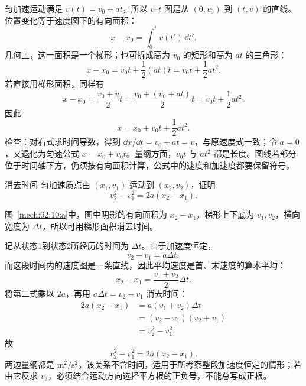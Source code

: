 {\begin{xesolution}
匀加速运动满足 $v(t)=v_0+at$，所以 $v$--$t$ 图是从 $(0,v_0)$ 到
$(t,v)$ 的直线。位置变化等于速度图下的有向面积：
\[
 x-x_0=\int_0^t v(t')\,\dd t'.
\]
几何上，这一面积是一个梯形；也可拆成高为 $v_0$ 的矩形和高为 $at$ 的三角形：
\[
 x-x_0=v_0t+\frac12(at)t
 =v_0t+\frac12at^2.
\]
若直接用梯形面积，同样有
\[
  x-x_0=\frac{v_0+v}{2}t
  =\frac{v_0+(v_0+at)}{2}t
  =v_0t+\frac12at^2.
\]
因此
\[
 \boxed{x=x_0+v_0t+\frac12at^2}.
\]
检查：对右式求时间导数，得到 $\dd x/\dd t=v_0+at=v$，与原速度式一致；令 $a=0$，又退化为匀速公式 $x=x_0+v_0t$。量纲方面，$v_0t$ 与 $at^2$ 都是长度。图线若部分位于时间轴下方，仍须按有向面积计算，公式中的速度和加速度都要保留符号。
\end{xesolution}

\begin{origexamplebox}{消去时间}\label{ch02:ex:k02-2-10}
匀加速质点由 $(x_1,v_1)$ 运动到 $(x_2,v_2)$，证明
\[
  v_2^2-v_1^2=2a(x_2-x_1).
\]

\begin{qualityfigure}
\label{mech:02:10:q}
\end{qualityfigure}
\end{origexamplebox}
\begin{xesolution}
\begin{qualityfigure}
\label{mech:02:10:a}
\end{qualityfigure}
图~\ref{mech:02:10:a}中，图中阴影的有向面积为 $x_2-x_1$，梯形上下底为 $v_1,v_2$，横向宽度为 $\Delta t$，所以可用梯形面积消去时间。

记从状态1到状态2所经历的时间为 $\Delta t$。由于加速度恒定，
\[
 v_2-v_1=a\Delta t,
\]
而这段时间内的速度图是一条直线，因此平均速度是首、末速度的算术平均：
\[
  x_2-x_1=\frac{v_1+v_2}{2}\Delta t.
\]
将第二式乘以 $2a$，再用 $a\Delta t=v_2-v_1$ 消去时间：
\[
\begin{aligned}
2a(x_2-x_1)
 &=a(v_1+v_2)\Delta t\\
 &=(v_2-v_1)(v_2+v_1)\\
 &=v_2^2-v_1^2.
\end{aligned}
\]
故
\[
 \boxed{v_2^2-v_1^2=2a(x_2-x_1)}.
\]
两边量纲都是 $\mathrm{m^2/s^2}$。该关系不含时间，适用于所考察整段加速度恒定的情形；若由它反求 $v_2$，必须结合运动方向选择平方根的正负号，不能总写成正根。
\end{xesolution}

}
